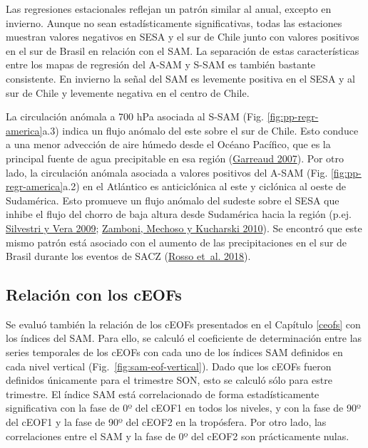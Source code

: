 \documentclass[12pt,oneside,a4paper]{reedthesis}
\begin{document}
Las regresiones estacionales reflejan un patrón similar al anual, excepto en invierno.
Aunque no sean estadísticamente significativas, todas las estaciones muestran valores negativos en SESA y el sur de Chile junto con valores positivos en el sur de Brasil en relación con el SAM.
La separación de estas características entre los mapas de regresión del A-SAM y S-SAM es también bastante consistente.
En invierno la señal del SAM es levemente positiva en el SESA y al sur de Chile y levemente negativa en el centro de Chile.

La circulación anómala a 700 hPa asociada al S-SAM (Fig. \ref{fig:pp-regr-america}a.3) indica un flujo anómalo del este sobre el sur de Chile.
Esto conduce a una menor advección de aire húmedo desde el Océano Pacífico, que es la principal fuente de agua precipitable en esa región (\protect\hyperlink{ref-garreaud2007}{Garreaud 2007}).
Por otro lado, la circulación anómala asociada a valores positivos del A-SAM (Fig. \ref{fig:pp-regr-america}a.2) en el Atlántico es anticiclónica al este y ciclónica al oeste de Sudamérica.
Esto promueve un flujo anómalo del sudeste sobre el SESA que inhibe el flujo del chorro de baja altura desde Sudamérica hacia la región (p.ej. \protect\hyperlink{ref-silvestri2009}{Silvestri y Vera 2009}; \protect\hyperlink{ref-zamboni2010}{Zamboni, Mechoso y Kucharski 2010}).
Se encontró que este mismo patrón está asociado con el aumento de las precipitaciones en el sur de Brasil durante los eventos de SACZ (\protect\hyperlink{ref-rosso2018}{Rosso et~al. 2018}).

\hypertarget{sam-ceof}{%
\subsection{Relación con los cEOFs}\label{sam-ceof}}

Se evaluó también la relación de los cEOFs presentados en el Capítulo \ref{ceofs} con los índices del SAM.
Para ello, se calculó el coeficiente de determinación entre las series temporales de los cEOFs con cada uno de los índices SAM definidos en cada nivel vertical (Fig.~\ref{fig:sam-eof-vertical}).
Dado que los cEOFs fueron definidos únicamente para el trimestre SON, esto se calculó sólo para estre trimestre.
El índice SAM está correlacionado de forma estadísticamente significativa con la fase de 0º del cEOF1 en todos los niveles, y con la fase de 90º del cEOF1 y la fase de 90º del cEOF2 en la tropósfera.
Por otro lado, las correlaciones entre el SAM y la fase de 0º del cEOF2 son prácticamente nulas.
\end{document}
